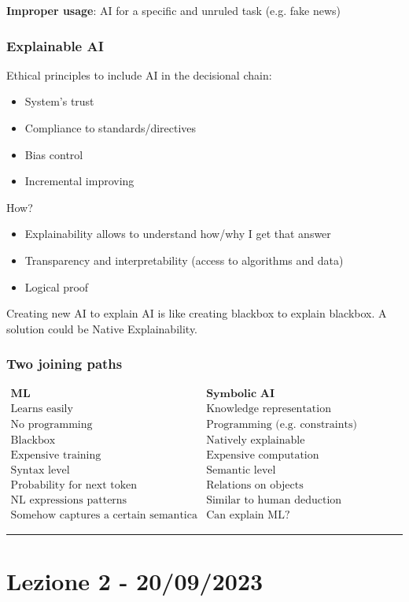 \documentclass[11pt]{article}
\begin{document}
        \textbf{Improper usage}: AI for a specific and unruled task (e.g. fake news)

    \subsubsection{Explainable AI}
        Ethical principles to include AI in the decisional chain:
        \begin{itemize}
            \item System's trust
            \item Compliance to standards/directives
            \item Bias control
            \item Incremental improving
        \end{itemize}

        How?
        \begin{itemize}
            \item Explainability allows to understand how/why I get that answer
            \item Transparency and interpretability (access to algorithms and data)
            \item Logical proof
        \end{itemize}

        Creating new AI to explain AI is like creating blackbox to explain blackbox. A solution could be Native Explainability.

    \subsubsection{Two joining paths}
        $\begin{array}{ll}
            \textbf{ML}   &   \textbf{Symbolic AI} \\
            \text{Learns easily}    &  \text{Knowledge representation} \\
            \text{No programming}   &   \text{Programming (e.g. constraints)} \\
            \text{Blackbox} &   \text{Natively explainable} \\
            \text{Expensive training}   &   \text{Expensive computation} \\
            \text{Syntax level} &   \text{Semantic level} \\
            \text{Probability for next token}   &   \text{Relations on objects} \\
            \text{NL expressions patterns}  &   \text{Similar to human deduction} \\
            \text{Somehow captures a certain semantica} &   \text{Can explain ML?}
        \end{array}$
        
\vspace{0.5cm}
\hrule
\vspace{0.5cm}

\section{Lezione 2 - 20/09/2023}
\end{document}
